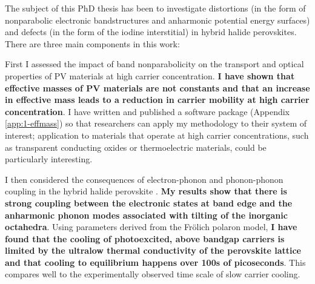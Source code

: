 The subject of this PhD thesis has been to investigate distortions (in the form of nonparabolic electronic bandstructures and anharmonic potential energy surfaces) and defects (in the form of the iodine interstitial) in hybrid halide perovskites. There are three main components in this work:

First I assessed the impact of band nonparabolicity on the transport and optical properties of PV materials at high carrier concentration. \textbf{I have shown that effective masses of PV materials are not constants and that an increase in effective mass leads to a reduction in carrier mobility at high carrier concentration}. I have written and published a software package (Appendix \ref{app:1-effmass}) so that researchers can apply my methodology to their system of interest; application to materials that operate at high carrier concentrations, such as transparent conducting oxides or thermoelectric materials, could be particularly interesting.

I then considered the consequences of electron-phonon and phonon-phonon coupling in the hybrid halide perovskite . \textbf{My results show that there is strong coupling between the electronic states at band edge and the anharmonic phonon modes associated with tilting of the inorganic octahedra}. Using parameters derived from the Fr\"{o}lich polaron model, \textbf{I have found that the cooling of photoexcited, above bandgap carriers is limited by the ultralow thermal conductivity of the perovskite lattice and that cooling to equilibrium happens over 100s of picoseconds}. This compares well to the experimentally observed time scale of slow carrier cooling.

